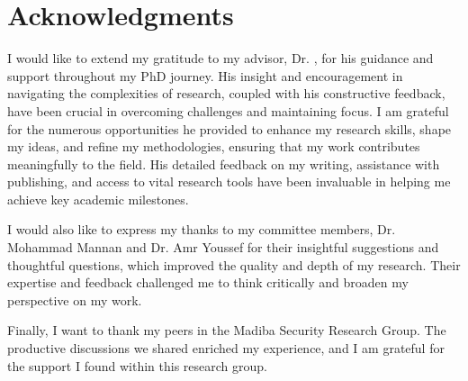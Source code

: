 
\chapter*{Acknowledgments}
I would like to extend my gratitude to my advisor, Dr. \supv, for his guidance and support throughout my PhD journey. His insight and encouragement in navigating the complexities of research, coupled with his constructive feedback, have been crucial in overcoming challenges and maintaining focus. I am grateful for the numerous opportunities he provided to enhance my research skills, shape my ideas, and refine my methodologies, ensuring that my work contributes meaningfully to the field. His detailed feedback on my writing, assistance with publishing, and access to vital research tools have been invaluable in helping me achieve key academic milestones.

I would also like to express my thanks to my committee members, Dr. Mohammad Mannan and Dr. Amr Youssef for their insightful suggestions and thoughtful questions, which improved the quality and depth of my research. Their expertise and feedback challenged me to think critically and broaden my perspective on my work.

Finally, I want to thank my peers in the Madiba Security Research Group. The productive discussions we shared enriched my experience, and I am grateful for the support I found within this research group.